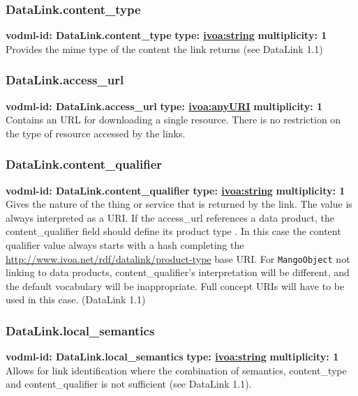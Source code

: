     \subsubsection{DataLink.content\_type}
      \textbf{vodml-id: DataLink.content\_type} \newline
      \textbf{type: \hyperref[sect:ivoa]{ivoa:string}} \newline
      \textbf{multiplicity: 1} \newline
      Provides the mime type of the content the link returns (see DataLink 1.1)

    \subsubsection{DataLink.access\_url}
      \textbf{vodml-id: DataLink.access\_url} \newline
      \textbf{type: \hyperref[sect:ivoa]{ivoa:anyURI}} \newline
      \textbf{multiplicity: 1} \newline
      Contains an URL for downloading a single resource. There is no restriction on the type of resource accessed by the links.

    \subsubsection{DataLink.content\_qualifier}
      \textbf{vodml-id: DataLink.content\_qualifier} \newline
      \textbf{type: \hyperref[sect:ivoa]{ivoa:string}} \newline
      \textbf{multiplicity: 1} \newline
      Gives the nature of the thing or service that is returned by the link. The value is always interpreted as a URI. If the access\_url references a data product, the content\_qualifier field should define its product type . In this case the content qualifier value always starts with a hash completing the \url{http://www.ivoa.net/rdf/datalink/product-type} base URI. For \texttt{MangoObject} not linking to data products, content\_qualifier’s interpretation will be different, and the default vocabulary will be inappropriate. Full concept URIs will have to be used in this case. (DataLink 1.1)

    \subsubsection{DataLink.local\_semantics}
      \textbf{vodml-id: DataLink.local\_semantics} \newline
      \textbf{type: \hyperref[sect:ivoa]{ivoa:string}} \newline
      \textbf{multiplicity: 1} \newline
      Allows for link identification where the combination of semantics, content\_type and content\_qualifier is not sufficient (see DataLink 1.1).

